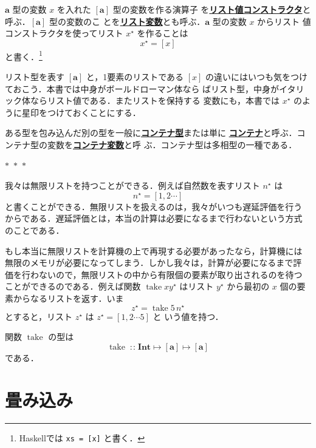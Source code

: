 \documentclass[a5paper,twoside,fleqn]{jsbook}
\newcommand{\separator}{\begin{center}$*$~$*$~$*$\end{center}}
\newcommand{\programminglanguage}[1]{\textsf{#1}}
\newcommand{\haskell}{\programminglanguage{Haskell}}
\newcommand{\keyword}[1]{{\underline{\textbf{#1}}}}
\newcommand{\code}[1]{\texttt{#1}}
\newcommand{\mEmptyList}{{[\,]}}
\newcommand{\mSpecialFunc}[1]{\mathrm{#1}}
\DeclareMathOperator{\mTake}{\mSpecialFunc{take}}
\DeclareMathOperator{\mAppend}{\oplus}
\DeclareMathOperator{\mIn}{{:\!:}}
\DeclareMathOperator{\mMapsTo}{\mapsto}
\newcommand{\mType}[1]{\mathbf{#1}}
\newcommand{\mIntType}{\mType{Int}}
\newcommand{\mListType}[1]{[\mType{#1}]}
\newcommand{\mListWith}[1]{\left[#1\right]}
\newcommand{\mTupleWith}[1]{\left(#1\right)}
\newcommand{\mList}[1]{{#1}^\mathrm{\star}}
\newcommand{\mProj}[2]{#1\mMapsTo#2}
\begin{document}
$\mType{a}$ 型の変数 $x$ を入れた $\mListType{a}$ 型の変数を作る演算子
を\keyword{リスト値コンストラクタ}と呼ぶ．$\mListType{a}$ 型の変数のこ
とを\keyword{リスト変数}とも呼ぶ．$\mType{a}$ 型の変数 $x$ からリスト
値コンストラクタを使ってリスト $\mList{x}$ を作ることは
\begin{equation}
\mList{x}=\mListWith{x}
\end{equation}
と書く．\footnote{\haskell では \code{xs = [x]} と書く．}

リスト型を表す $\mListType{a}$ と，1要素のリストである $\mListWith{x}$
の違いにはいつも気をつけておこう．本書では中身がボールドローマン体なら
ばリスト型，中身がイタリック体ならリスト値である．またリストを保持する
変数にも，本書では $\mList{x}$ のように星印をつけておくことにする．

ある型を包み込んだ別の型を一般に\keyword{コンテナ型}または単に
\keyword{コンテナ}と呼ぶ．コンテナ型の変数を\keyword{コンテナ変数}と呼
ぶ．コンテナ型は多相型の一種である．


\separator

我々は無限リストを持つことができる．例えば自然数を表すリスト
$\mList{n}$ は
\begin{equation*}
\mList{n}=\mListWith{1,2\dotsb}
\end{equation*}
と書くことができる．無限リストを扱えるのは，我々がいつも遅延評価を行う
からである．遅延評価とは，本当の計算は必要になるまで行わないという方式
のことである．

もし本当に無限リストを計算機の上で再現する必要があったなら，計算機には
無限のメモリが必要になってしまう．しかし我々は，計算が必要になるまで評
価を行わないので，無限リストの中から有限個の要素が取り出されるのを待つ
ことができるのである．例えば関数 $\mTake x\mList{y}$ はリスト
$\mList{y}$ から最初の $x$ 個の要素からなるリストを返す．いま
\begin{equation*}
\mList{z}=\mTake5\,\mList{n}
\end{equation*}
とすると，リスト $\mList{z}$ は $\mList{z}=\mListWith{1,2\dotsb5}$ と
いう値を持つ．

関数 $\mTake$ の型は
\begin{equation}
\mTake\mIn{}\mProj{\mIntType}{\mProj{\mListType{a}}{\mListType{a}}}
\end{equation}
である．

\section{畳み込み}
\label{sec:convolution}
\end{document}
